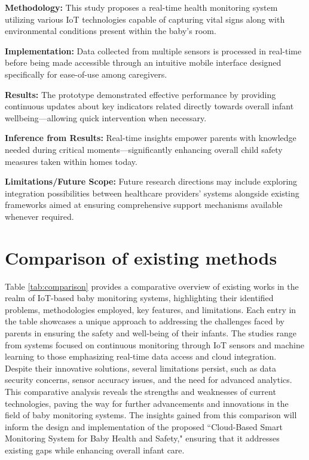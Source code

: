 \documentclass[12pt,a4paper]{report}
\begin{document}
\setlength{\parskip}{1em}  %


\noindent\textbf{Methodology:} This study proposes a real-time health monitoring system utilizing various IoT technologies capable of capturing vital signs along with environmental conditions present within the baby's room.

\setlength{\parskip}{1em}  %


\noindent\textbf{Implementation:} Data collected from multiple sensors is processed in real-time before being made accessible through an intuitive mobile interface designed specifically for ease-of-use among caregivers.
\setlength{\parskip}{1em}  %

\noindent\textbf{Results:} The prototype demonstrated effective performance by providing continuous updates about key indicators related directly towards overall infant wellbeing—allowing quick intervention when necessary.

\setlength{\parskip}{1em}  %


\noindent\textbf{Inference from Results:} Real-time insights empower parents with knowledge needed during critical moments—significantly enhancing overall child safety measures taken within homes today.


\setlength{\parskip}{1em}  %

\noindent\textbf{Limitations/Future Scope:} Future research directions may include exploring integration possibilities between healthcare providers’ systems alongside existing frameworks aimed at ensuring comprehensive support mechanisms available whenever required.
\setlength{\parskip}{1em}  %

\section{Comparison of existing methods}
Table \ref{tab:comparison} provides a comparative overview of existing works in the realm of IoT-based baby monitoring systems, highlighting their identified problems, methodologies employed, key features, and limitations. Each entry in the table showcases a unique approach to addressing the challenges faced by parents in ensuring the safety and well-being of their infants. The studies range from systems focused on continuous monitoring through IoT sensors and machine learning to those emphasizing real-time data access and cloud integration. Despite their innovative solutions, several limitations persist, such as data security concerns, sensor accuracy issues, and the need for advanced analytics. This comparative analysis reveals the strengths and weaknesses of current technologies, paving the way for further advancements and innovations in the field of baby monitoring systems. The insights gained from this comparison will inform the design and implementation of the proposed ``Cloud-Based Smart Monitoring System for Baby Health and Safety," ensuring that it addresses existing gaps while enhancing overall infant care.
\end{document}
